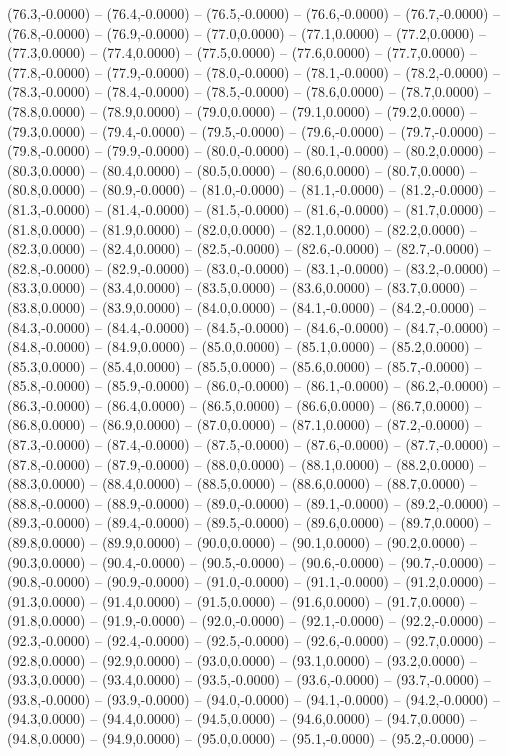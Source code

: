 \documentclass{SVnote}
\begin{document}
(76.3,-0.0000) -- (76.4,-0.0000) -- (76.5,-0.0000) -- (76.6,-0.0000) -- (76.7,-0.0000) -- (76.8,-0.0000) -- (76.9,-0.0000) -- (77.0,0.0000) -- (77.1,0.0000) -- (77.2,0.0000) -- (77.3,0.0000) -- (77.4,0.0000) -- (77.5,0.0000) -- (77.6,0.0000) -- (77.7,0.0000) -- (77.8,-0.0000) -- (77.9,-0.0000) -- (78.0,-0.0000) -- (78.1,-0.0000) -- (78.2,-0.0000) -- (78.3,-0.0000) -- (78.4,-0.0000) -- (78.5,-0.0000) -- (78.6,0.0000) -- (78.7,0.0000) -- (78.8,0.0000) -- (78.9,0.0000) -- (79.0,0.0000) -- (79.1,0.0000) -- (79.2,0.0000) -- (79.3,0.0000) -- (79.4,-0.0000) -- (79.5,-0.0000) -- (79.6,-0.0000) -- (79.7,-0.0000) -- (79.8,-0.0000) -- (79.9,-0.0000) -- (80.0,-0.0000) -- (80.1,-0.0000) -- (80.2,0.0000) -- (80.3,0.0000) -- (80.4,0.0000) -- (80.5,0.0000) -- (80.6,0.0000) -- (80.7,0.0000) -- (80.8,0.0000) -- (80.9,-0.0000) -- (81.0,-0.0000) -- (81.1,-0.0000) -- (81.2,-0.0000) -- (81.3,-0.0000) -- (81.4,-0.0000) -- (81.5,-0.0000) -- (81.6,-0.0000) -- (81.7,0.0000) -- (81.8,0.0000) -- (81.9,0.0000) -- (82.0,0.0000) -- (82.1,0.0000) -- (82.2,0.0000) -- (82.3,0.0000) -- (82.4,0.0000) -- (82.5,-0.0000) -- (82.6,-0.0000) -- (82.7,-0.0000) -- (82.8,-0.0000) -- (82.9,-0.0000) -- (83.0,-0.0000) -- (83.1,-0.0000) -- (83.2,-0.0000) -- (83.3,0.0000) -- (83.4,0.0000) -- (83.5,0.0000) -- (83.6,0.0000) -- (83.7,0.0000) -- (83.8,0.0000) -- (83.9,0.0000) -- (84.0,0.0000) -- (84.1,-0.0000) -- (84.2,-0.0000) -- (84.3,-0.0000) -- (84.4,-0.0000) -- (84.5,-0.0000) -- (84.6,-0.0000) -- (84.7,-0.0000) -- (84.8,-0.0000) -- (84.9,0.0000) -- (85.0,0.0000) -- (85.1,0.0000) -- (85.2,0.0000) -- (85.3,0.0000) -- (85.4,0.0000) -- (85.5,0.0000) -- (85.6,0.0000) -- (85.7,-0.0000) -- (85.8,-0.0000) -- (85.9,-0.0000) -- (86.0,-0.0000) -- (86.1,-0.0000) -- (86.2,-0.0000) -- (86.3,-0.0000) -- (86.4,0.0000) -- (86.5,0.0000) -- (86.6,0.0000) -- (86.7,0.0000) -- (86.8,0.0000) -- (86.9,0.0000) -- (87.0,0.0000) -- (87.1,0.0000) -- (87.2,-0.0000) -- (87.3,-0.0000) -- (87.4,-0.0000) -- (87.5,-0.0000) -- (87.6,-0.0000) -- (87.7,-0.0000) -- (87.8,-0.0000) -- (87.9,-0.0000) -- (88.0,0.0000) -- (88.1,0.0000) -- (88.2,0.0000) -- (88.3,0.0000) -- (88.4,0.0000) -- (88.5,0.0000) -- (88.6,0.0000) -- (88.7,0.0000) -- (88.8,-0.0000) -- (88.9,-0.0000) -- (89.0,-0.0000) -- (89.1,-0.0000) -- (89.2,-0.0000) -- (89.3,-0.0000) -- (89.4,-0.0000) -- (89.5,-0.0000) -- (89.6,0.0000) -- (89.7,0.0000) -- (89.8,0.0000) -- (89.9,0.0000) -- (90.0,0.0000) -- (90.1,0.0000) -- (90.2,0.0000) -- (90.3,0.0000) -- (90.4,-0.0000) -- (90.5,-0.0000) -- (90.6,-0.0000) -- (90.7,-0.0000) -- (90.8,-0.0000) -- (90.9,-0.0000) -- (91.0,-0.0000) -- (91.1,-0.0000) -- (91.2,0.0000) -- (91.3,0.0000) -- (91.4,0.0000) -- (91.5,0.0000) -- (91.6,0.0000) -- (91.7,0.0000) -- (91.8,0.0000) -- (91.9,-0.0000) -- (92.0,-0.0000) -- (92.1,-0.0000) -- (92.2,-0.0000) -- (92.3,-0.0000) -- (92.4,-0.0000) -- (92.5,-0.0000) -- (92.6,-0.0000) -- (92.7,0.0000) -- (92.8,0.0000) -- (92.9,0.0000) -- (93.0,0.0000) -- (93.1,0.0000) -- (93.2,0.0000) -- (93.3,0.0000) -- (93.4,0.0000) -- (93.5,-0.0000) -- (93.6,-0.0000) -- (93.7,-0.0000) -- (93.8,-0.0000) -- (93.9,-0.0000) -- (94.0,-0.0000) -- (94.1,-0.0000) -- (94.2,-0.0000) -- (94.3,0.0000) -- (94.4,0.0000) -- (94.5,0.0000) -- (94.6,0.0000) -- (94.7,0.0000) -- (94.8,0.0000) -- (94.9,0.0000) -- (95.0,0.0000) -- (95.1,-0.0000) -- (95.2,-0.0000) -- 
\end{document}
